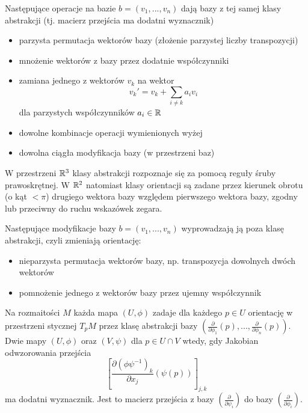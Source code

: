 Następujące operacje na bazie $b=(v_1,...,v_n)$ dają bazy z tej samej klasy abstrakcji (tj. macierz przejścia ma dodatni wyznacznik)
\begin{itemize}
  \item parzysta permutacja wektorów bazy (złożenie parzystej liczby transpozycji)
  \item mnożenie wektorów z bazy przez dodatnie współczynniki
  \item zamiana jednego z wektorów $v_k$ na wektor
  $$v_k'=v_k+\sum_{i\neq k}a_iv_i$$
  dla parzystych współczynników $a_i\in \mathbb{R}$
  \item dowolne kombinacje operacji wymienionych wyżej
  \item dowolna ciągła modyfikacja bazy (w przestrzeni baz)
\end{itemize}

W przestrzeni $\mathbb{R}^3$ klasy abstrakcji rozpoznaje się za pomocą reguły śruby prawoskrętnej. W $\mathbb{R}^2$ natomiast klasy orientacji są zadane przez kierunek obrotu (o kąt $<\pi$) drugiego wektora bazy względem pierwszego wektora bazy, zgodny lub przeciwny do ruchu wskazówek zegara.

Następujące modyfikacje bazy $b=(v_1,...,v_n)$ wyprowadzają ją poza klasę abstrakcji, czyli zmieniają orientację:
\begin{itemize}
  \item nieparzysta permutacja wektorów bazy, np. transpozycja dowolnych dwóch wektorów
  \item pomnożenie jednego z wektorów bazy przez ujemny współczynnik
\end{itemize}
\bigskip

Na rozmaitości $M$ każda mapa $(U,\phi)$ zadaje dla każdego $p\in U$ orientację w przestrzeni stycznej $T_pM$ przez klasę abstrakcji bazy $(\frac{\partial}{\partial\phi_1}(p),...,\frac{\partial}{\partial\phi_n}(p))$. Dwie mapy $(U,\phi)$ oraz $(V,\psi)$  dla $p\in U\cap V$ wtedy, gdy Jakobian odwzorowania przejścia
$$\left[\frac{\partial(\phi\psi^{-1})_k}{\partial x_j}(\psi(p))\right]_{j,k}$$
ma dodatni wyznacznik. Jest to macierz przejścia z bazy $\left(\frac{\partial}{\partial\psi_i}\right)$ do bazy $\left(\frac{\partial}{\partial\phi_i}\right)$.

